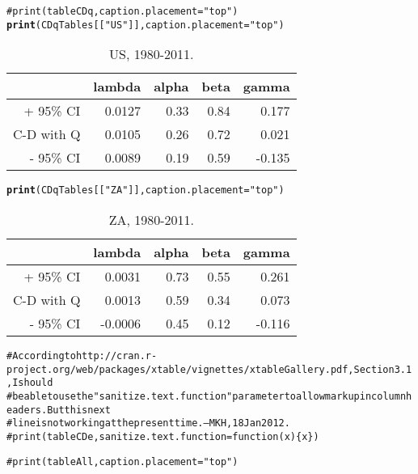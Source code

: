 \documentclass[preprint,authoryear,12pt]{elsarticle}\usepackage{graphicx, color}
\makeatletter
\newcommand{\hlfunctioncall}[1]{\textcolor[rgb]{0.501960784313725,0,0.329411764705882}{\textbf{#1}}}%
\newcommand{\hlstring}[1]{\textcolor[rgb]{0.6,0.6,1}{#1}}%
\newcommand{\hlcomment}[1]{\textcolor[rgb]{0.180392156862745,0.6,0.341176470588235}{#1}}%
\newenvironment{kframe}{%
 \def\at@end@of@kframe{}%
 \ifinner\ifhmode%
  \def\at@end@of@kframe{\end{minipage}}%
  \begin{minipage}{\columnwidth}%
 \fi\fi%
 \def\FrameCommand##1{\hskip\@totalleftmargin \hskip-\fboxsep
 \colorbox{shadecolor}{##1}\hskip-\fboxsep
     \hskip-\linewidth \hskip-\@totalleftmargin \hskip\columnwidth}%
 \MakeFramed {\advance\hsize-\width
   \@totalleftmargin\z@ \linewidth\hsize
   \@setminipage}}%
 {\par\unskip\endMakeFramed%
 \at@end@of@kframe}
\makeatother
\begin{document}
\begin{kframe}
\begin{alltt}

\hlcomment{#print(tableCDq, caption.placement="top")}
\hlfunctioncall{print}(CDqTables[[\hlstring{"US"}]], caption.placement=\hlstring{"top"})
\end{alltt}
\end{kframe}%
\begin{table}[ht]
\begin{center}
\caption{US, 1980-2011.}
\begin{tabular}{rrrrr}
  \hline
 & lambda & alpha & beta & gamma \\ 
  \hline
+ 95\% CI & 0.0127 & 0.33 & 0.84 & 0.177 \\ 
  C-D with Q & 0.0105 & 0.26 & 0.72 & 0.021 \\ 
  - 95\% CI & 0.0089 & 0.19 & 0.59 & -0.135 \\ 
   \hline
\end{tabular}
\end{center}
\end{table}
\begin{kframe}\begin{alltt}
\hlfunctioncall{print}(CDqTables[[\hlstring{"ZA"}]], caption.placement=\hlstring{"top"})
\end{alltt}
\end{kframe}%
\begin{table}[ht]
\begin{center}
\caption{ZA, 1980-2011.}
\begin{tabular}{rrrrr}
  \hline
 & lambda & alpha & beta & gamma \\ 
  \hline
+ 95\% CI & 0.0031 & 0.73 & 0.55 & 0.261 \\ 
  C-D with Q & 0.0013 & 0.59 & 0.34 & 0.073 \\ 
  - 95\% CI & -0.0006 & 0.45 & 0.12 & -0.116 \\ 
   \hline
\end{tabular}
\end{center}
\end{table}
\begin{kframe}\begin{alltt}
\hlcomment{# According to http://cran.r-project.org/web/packages/xtable/vignettes/xtableGallery.pdf, Section 3.1, I should }
\hlcomment{# be able to use the "sanitize.text.function" parameter to allow markup in column headers. But this next}
\hlcomment{# line is not working at the present time. --MKH, 18 Jan 2012.}
\hlcomment{# print(tableCDe, sanitize.text.function = function(x)\{x\})}

\hlcomment{#print(tableAll, caption.placement="top")}
\end{alltt}
\end{kframe}
\end{document}
